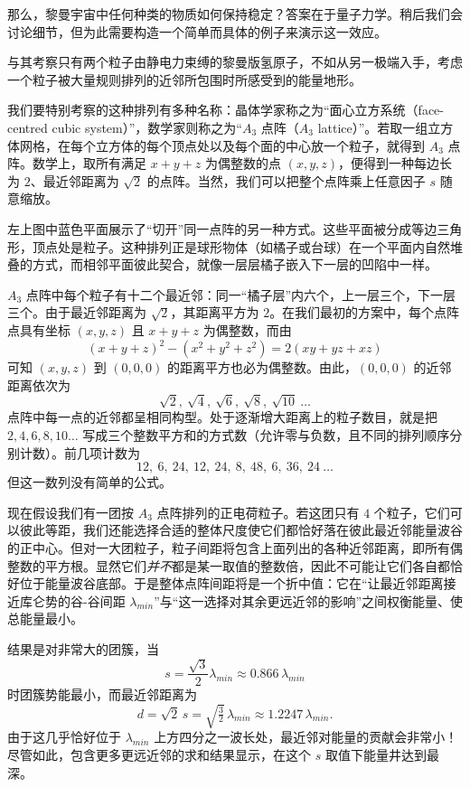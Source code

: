 那么，黎曼宇宙中任何种类的物质如何保持稳定？答案在于量子力学。稍后我们会讨论细节，但为此需要构造一个简单而具体的例子来演示这一效应。

与其考察只有两个粒子由静电力束缚的黎曼版氢原子，不如从另一极端入手，考虑一个粒子被大量规则排列的近邻所包围时所感受到的能量地形。

我们要特别考察的这种排列有多种名称：晶体学家称之为“面心立方系统（face-centred cubic system）”，数学家则称之为“$A_{3}$ 点阵（$A_{3}$ lattice）”。若取一组立方体网格，在每个立方体的每个顶点处以及每个面的中心放一个粒子，就得到 $A_{3}$ 点阵。数学上，取所有满足 $x+y+z$ 为偶整数的点 $(x,y,z)$，便得到一种每边长为 $2$、最近邻距离为 $\sqrt{2}$ 的点阵。当然，我们可以把整个点阵乘上任意因子 $s$ 随意缩放。


左上图中蓝色平面展示了“切开”同一点阵的另一种方式。这些平面被分成等边三角形，顶点处是粒子。这种排列正是球形物体（如橘子或台球）在一个平面内自然堆叠的方式，而相邻平面彼此契合，就像一层层橘子嵌入下一层的凹陷中一样。

$A_{3}$ 点阵中每个粒子有十二个最近邻：同一“橘子层”内六个，上一层三个，下一层三个。由于最近邻距离为 $\sqrt{2}$，其距离平方为 $2$。在我们最初的方案中，每个点阵点具有坐标 $(x,y,z)$ 且 $x+y+z$ 为偶整数，而由
\begin{equation}
(x+y+z)^{2}-(x^{2}+y^{2}+z^{2})=2(xy+yz+xz)
\end{equation}
可知 $(x,y,z)$ 到 $(0,0,0)$ 的距离平方也必为偶整数。由此，$(0,0,0)$ 的近邻距离依次为
\[
\sqrt{2},\ \sqrt{4},\ \sqrt{6},\ \sqrt{8},\ \sqrt{10}\ \dots
\]
点阵中每一点的近邻都呈相同构型。处于逐渐增大距离上的粒子数目，就是把 $2,4,6,8,10\dots$ 写成三个整数平方和的方式数（允许零与负数，且不同的排列顺序分别计数）。前几项计数为
\[
12,\ 6,\ 24,\ 12,\ 24,\ 8,\ 48,\ 6,\ 36,\ 24\ \dots
\]
但这一数列没有简单的公式。

现在假设我们有一团按 $A_{3}$ 点阵排列的正电荷粒子。若这团只有 $4$ 个粒子，它们可以彼此等距，我们还能选择合适的整体尺度使它们都恰好落在彼此最近邻能量波谷的正中心。但对一大团粒子，粒子间距将包含上面列出的各种近邻距离，即所有偶整数的平方根。显然它们\emph{并不}都是某一取值的整数倍，因此不可能让它们各自都恰好位于能量波谷底部。于是整体点阵间距将是一个折中值：它在“让最近邻距离接近库仑势的谷-谷间距 $\lambda_{min}$”与“这一选择对其余更远近邻的影响”之间权衡能量、使总能量最小。

结果是对非常大的团簇，当
\begin{equation}
s=\frac{\sqrt{3}}{2}\lambda_{min}\approx 0.866\,\lambda_{min}
\end{equation}
时团簇势能最小，而最近邻距离为
\begin{equation}
d=\sqrt{2}\,s=\sqrt{\tfrac{3}{2}}\,\lambda_{min}\approx 1.2247\,\lambda_{min}.
\end{equation}
由于这几乎恰好位于 $\lambda_{min}$ 上方四分之一波长处，最近邻对能量的贡献会非常小！尽管如此，包含更多更远近邻的求和结果显示，在这个 $s$ 取值下能量井达到最深。

